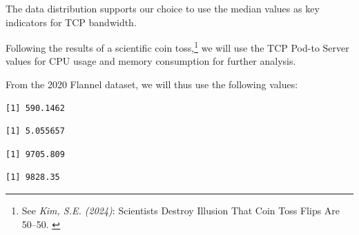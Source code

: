 The data distribution supports our choice to use the median values as key indicators for TCP bandwidth.

Following the results of a scientific coin toss,\footnote{See \textit{Kim, S.E. (2024)}: Scientists Destroy Illusion That Coin Toss Flips Are 50–50. \cite{coinToss}} we will use the TCP Pod-to Server values for CPU usage and memory consumption for further analysis.

From the 2020 Flannel dataset, we will thus use the following values:

\begin{Shaded}
\begin{Highlighting}[]
\SpecialCharTok{\$}
\end{Highlighting}
\end{Shaded}

\begin{verbatim}
[1] 590.1462
\end{verbatim}

\begin{Shaded}
\begin{Highlighting}[]
\SpecialCharTok{\$}
\end{Highlighting}
\end{Shaded}

\begin{verbatim}
[1] 5.055657
\end{verbatim}

\begin{Shaded}
\begin{Highlighting}[]
\SpecialCharTok{\$}
\end{Highlighting}
\end{Shaded}

\begin{verbatim}
[1] 9705.809
\end{verbatim}

\begin{Shaded}
\begin{Highlighting}[]
\SpecialCharTok{\$}
\end{Highlighting}
\end{Shaded}

\begin{verbatim}
[1] 9828.35
\end{verbatim}

